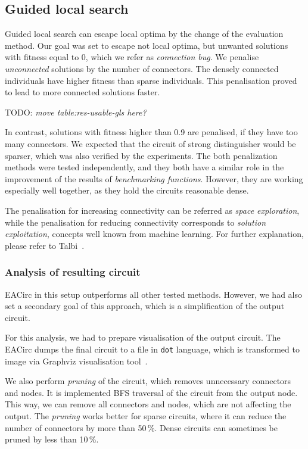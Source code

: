\documentclass[
  print, %
  Table,   %
  nolof,     %
  nolot,     %
  11pt, %
  oneside  %
]{fithesis3}
\newcommand{\todo}[1]{TODO: \textit{#1}}
\begin{document}
\subsection{Guided local search}
\label{subsec:res-ss-gls}

Guided local search can escape local optima by the change of the evaluation method. Our goal was set to escape not local optima, but unwanted solutions with fitness equal to 0, which we refer as \textit{connection bug}. We penalise \textit{unconnected} solutions by the number of connectors. The densely connected individuals have higher fitness than sparse individuals. This penalisation proved to lead to more connected solutions faster.

\todo{move table:res-usable-gls here?}

In contrast, solutions with fitness higher than 0.9 are penalised, if they have too many connectors. We expected that the circuit of strong distinguisher would be sparser, which was also verified by the experiments. The both penalization methods were tested independently, and they both have a similar role in the improvement of the results of \textit{benchmarking functions}. However, they are working especially well together, as they hold the circuits reasonable dense.

The penalisation for increasing connectivity can be referred as \textit{space exploration}, while the penalisation for reducing connectivity corresponds to \textit{solution exploitation}, concepts well known from machine learning. For further explanation, please refer to Talbi~\cite[section 1.3.3, page 24]{talbi2009metaheuristics}.

\subsubsection{\textbf{Analysis of resulting circuit}}
\label{subsubsec:res-ss-gls-circ-anal}

EACirc in this setup outperforms all other tested methods. However, we had also set a secondary goal of this approach, which is a simplification of the output circuit.

For this analysis, we had to prepare visualisation of the output circuit. The EACirc dumps the final circuit to a file in \texttt{dot} language, which is transformed to image via Graphviz visualisation tool~\cite{ellson2001graphviz}.

We also perform \textit{pruning} of the circuit, which removes unnecessary connectors and nodes. It is implemented BFS traversal of the circuit from the output node. This way, we can remove all connectors and nodes, which are not affecting the output. The \textit{pruning} works better for sparse circuits, where it can reduce the number of connectors by more than 50\,\%. Dense circuits can sometimes be pruned by less than 10\,\%.
\end{document}
